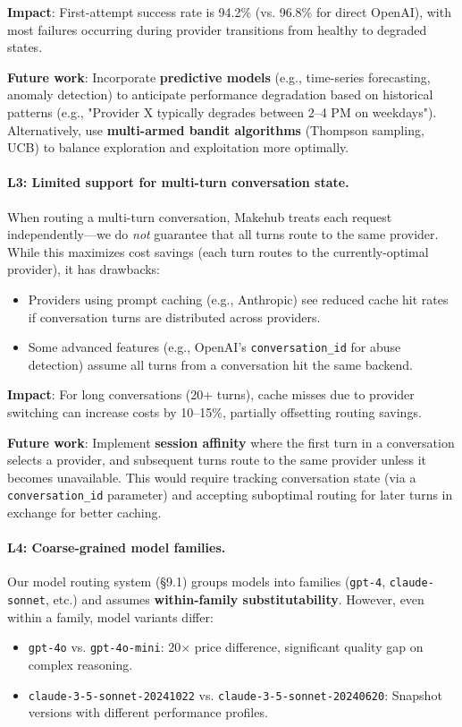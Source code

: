 \documentclass[english]{article}
\begin{document}
\textbf{Impact}: First-attempt success rate is 94.2\% (vs. 96.8\% for direct OpenAI), with most failures occurring during provider transitions from healthy to degraded states.

\textbf{Future work}: Incorporate \textbf{predictive models} (e.g., time-series forecasting, anomaly detection) to anticipate performance degradation based on historical patterns (e.g., "Provider X typically degrades between 2--4 PM on weekdays"). Alternatively, use \textbf{multi-armed bandit algorithms} (Thompson sampling, UCB) to balance exploration and exploitation more optimally.

\paragraph{L3: Limited support for multi-turn conversation state.}

When routing a multi-turn conversation, Makehub treats each request independently—we do \emph{not} guarantee that all turns route to the same provider. While this maximizes cost savings (each turn routes to the currently-optimal provider), it has drawbacks:
\begin{itemize}
    \item Providers using prompt caching (e.g., Anthropic) see reduced cache hit rates if conversation turns are distributed across providers.
    \item Some advanced features (e.g., OpenAI's \texttt{conversation\_id} for abuse detection) assume all turns from a conversation hit the same backend.
\end{itemize}

\textbf{Impact}: For long conversations (20+ turns), cache misses due to provider switching can increase costs by 10--15\%, partially offsetting routing savings.

\textbf{Future work}: Implement \textbf{session affinity} where the first turn in a conversation selects a provider, and subsequent turns route to the same provider unless it becomes unavailable. This would require tracking conversation state (via a \texttt{conversation\_id} parameter) and accepting suboptimal routing for later turns in exchange for better caching.

\paragraph{L4: Coarse-grained model families.}

Our model routing system (§9.1) groups models into families (\texttt{gpt-4}, \texttt{claude-sonnet}, etc.) and assumes \textbf{within-family substitutability}. However, even within a family, model variants differ:
\begin{itemize}
    \item \texttt{gpt-4o} vs. \texttt{gpt-4o-mini}: 20$\times$ price difference, significant quality gap on complex reasoning.
    \item \texttt{claude-3-5-sonnet-20241022} vs. \texttt{claude-3-5-sonnet-20240620}: Snapshot versions with different performance profiles.
\end{itemize}
\end{document}
